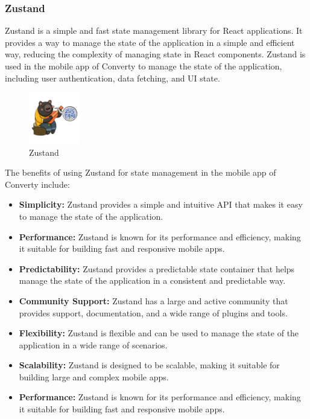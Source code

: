 \subsubsection{Zustand}
Zustand is a simple and fast state management library for React applications. It provides a way to manage the state of the application in a simple and efficient way, reducing the complexity of managing state in React components. Zustand is used in the mobile app of Converty to manage the state of the application, including user authentication, data fetching, and UI state.

\begin{figure}[H]
    \centering
    \includegraphics[width=0.2\textwidth]{Images/zustand.png}
    \caption{Zustand}
    \label{fig:zustand}
\end{figure}

The benefits of using Zustand for state management in the mobile app of Converty include:

\begin{itemize}
    \item \textbf{Simplicity:} Zustand provides a simple and intuitive API that makes it easy to manage the state of the application.
    \item \textbf{Performance:} Zustand is known for its performance and efficiency, making it suitable for building fast and responsive mobile apps.
    \item \textbf{Predictability:} Zustand provides a predictable state container that helps manage the state of the application in a consistent and predictable way.
    \item \textbf{Community Support:} Zustand has a large and active community that provides support, documentation, and a wide range of plugins and tools.
    \item \textbf{Flexibility:} Zustand is flexible and can be used to manage the state of the application in a wide range of scenarios.
    \item \textbf{Scalability:} Zustand is designed to be scalable, making it suitable for building large and complex mobile apps.
    \item \textbf{Performance:} Zustand is known for its performance and efficiency, making it suitable for building fast and responsive mobile apps.
\end{itemize}

